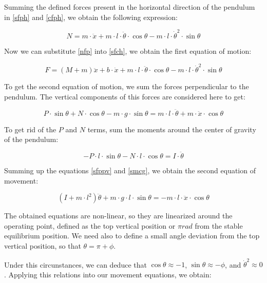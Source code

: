 Summing the defined forces present in the horizontal direction of the pendulum in \ref{sfph} and \ref{cfph}, we obtain the following expression:

\begin{equation} \label{nfp}
	N=m\cdot \ddot{x}+m\cdot l\cdot \ddot{\theta}\cdot \cos{\theta}-m\cdot l\cdot \dot{\theta}^2\cdot \sin{\theta}
\end{equation}

Now we can substitute \ref{nfp} into \ref{sfch}, we obtain the first equation of motion:

\begin{equation} \label{fem}
	F=(M+m)\ddot{x}+b\cdot \dot{x}+m\cdot l\cdot \ddot{\theta}\cdot \cos{\theta}-m\cdot l\cdot \dot{\theta}^2\cdot \sin{\theta}
\end{equation}

To get the second equation of motion, we sum the forces perpendicular to the pendulum. The vertical components of this forces are considered here to get:

\begin{equation} \label{sfppv}
	P\cdot \sin{\theta}+N\cdot \cos{\theta}-m\cdot g\cdot \sin{\theta}=m\cdot l\cdot \ddot{\theta}+m\cdot \ddot{x}\cdot \cos{\theta}
\end{equation}

To get rid of the $P$ and $N$ terms, sum the moments around the center of gravity of the pendulum:

\begin{equation} \label{smcg}
	-P\cdot l\cdot \sin{\theta}-N\cdot l\cdot \cos{\theta}=I\cdot \ddot{\theta}
\end{equation}

Summing up the equations \ref{sfppv} and \ref{smcg}, we obtain the second equation of movement:

\begin{equation} \label{sem}
	(I+m\cdot l^2)\ddot{\theta}+m\cdot g\cdot l\cdot \sin{\theta}=-m\cdot l\cdot \ddot{x}\cdot \cos{\theta}
\end{equation}

The obtained equations are non-linear, so they are linearized around the operating point, defined as the top vertical position or $\pi rad$ from the stable equilibrium position. We need also to define a small angle deviation from the top vertical position, so that $\theta=\pi+\phi$.

Under this circunstances, we can deduce that $\cos{\theta}\approx -1$, $\sin{\theta}\approx -\phi$, and $\dot{\theta}^2\approx 0$. Applying this relations into our movement equations, we obtain:

